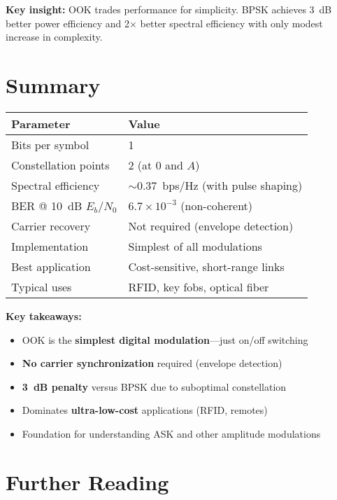 \textbf{Key insight:} OOK trades performance for simplicity. BPSK achieves 3~dB better power efficiency and 2$\times$ better spectral efficiency with only modest increase in complexity.

\section{Summary}

\begin{center}
\begin{tabular}{@{}ll@{}}
\toprule
\textbf{Parameter} & \textbf{Value} \\
\midrule
Bits per symbol & 1 \\
Constellation points & 2 (at $0$ and $A$) \\
Spectral efficiency & $\sim$0.37~bps/Hz (with pulse shaping) \\
BER @ 10~dB $E_b/N_0$ & $6.7 \times 10^{-3}$ (non-coherent) \\
Carrier recovery & Not required (envelope detection) \\
Implementation & Simplest of all modulations \\
Best application & Cost-sensitive, short-range links \\
Typical uses & RFID, key fobs, optical fiber \\
\bottomrule
\end{tabular}
\end{center}

\vspace{0.5cm}

\textbf{Key takeaways:}
\begin{itemize}
\item OOK is the \textbf{simplest digital modulation}---just on/off switching
\item \textbf{No carrier synchronization} required (envelope detection)
\item \textbf{3~dB penalty} versus BPSK due to suboptimal constellation
\item Dominates \textbf{ultra-low-cost} applications (RFID, remotes)
\item Foundation for understanding ASK and other amplitude modulations
\end{itemize}

\section{Further Reading}

